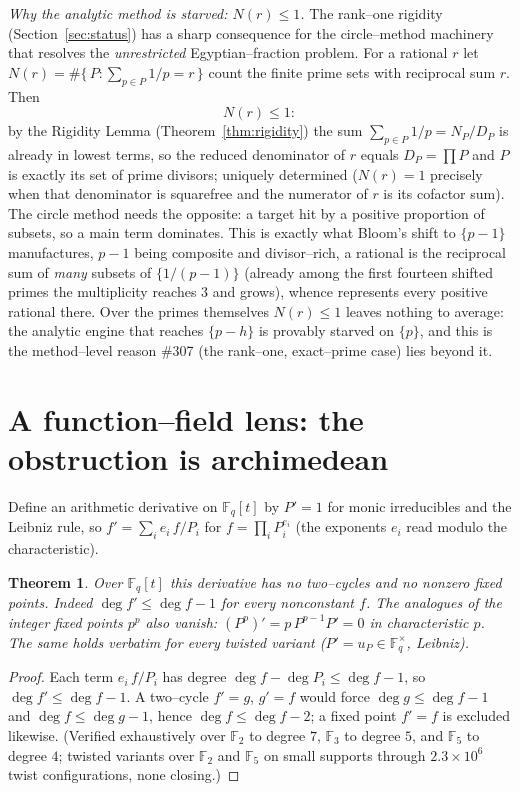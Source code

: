 \documentclass[11pt]{article}
\newtheorem{theorem}{Theorem}[section]
\theoremstyle{definition}
\begin{document}
\emph{Why the analytic method is starved: $N(r)\le1$.} The rank--one rigidity (Section~\ref{sec:status}) has a sharp consequence for the circle--method
machinery that resolves the \emph{unrestricted} Egyptian--fraction problem. For a rational $r$ let
$N(r)=\#\{\,P:\sum_{p\in P}1/p=r\,\}$ count the finite prime sets with reciprocal sum $r$. Then
\[N(r)\le1:\]
by the Rigidity Lemma (Theorem~\ref{thm:rigidity}) the sum $\sum_{p\in P}1/p=N_P/D_P$ is already in
lowest terms, so the reduced denominator of $r$ equals $D_P=\prod P$ and $P$ is exactly its set of
prime divisors; uniquely determined ($N(r)=1$ precisely when that denominator is squarefree and the
numerator of $r$ is its cofactor sum). The circle method needs the opposite: a target hit by a positive
proportion of subsets, so a main term dominates. This is exactly what Bloom's shift to $\{p-1\}$
manufactures, $p-1$ being composite and divisor--rich, a rational is the reciprocal sum of
\emph{many} subsets of $\{1/(p-1)\}$ (already among the first fourteen shifted primes the multiplicity
reaches $3$ and grows), whence \cite{BloomShifted} represents every positive rational there. Over the
primes themselves $N(r)\le1$ leaves nothing to average: the analytic engine that reaches $\{p-h\}$ is
provably starved on $\{p\}$, and this is the method--level reason \#307 (the rank--one, exact--prime
case) lies beyond it.


\section{A function--field lens: the obstruction is archimedean}\label{sec:ff}

Define an arithmetic derivative on $\mathbb{F}_q[t]$ by $P'=1$ for monic irreducibles and the Leibniz
rule, so $f'=\sum_i e_i\,f/P_i$ for $f=\prod_i P_i^{e_i}$ (the exponents $e_i$ read modulo the
characteristic).

\begin{theorem}\label{thm:ff}
Over $\mathbb{F}_q[t]$ this derivative has no two--cycles and no nonzero fixed points. Indeed
$\deg f'\le\deg f-1$ for every nonconstant $f$. The analogues of the integer fixed points $p^{p}$ also
vanish: $(P^{p})'=p\,P^{p-1}P'=0$ in characteristic $p$. The same holds verbatim for every twisted
variant ($P'=u_P\in\mathbb{F}_q^\times$, Leibniz).
\end{theorem}
\begin{proof}
Each term $e_i\,f/P_i$ has degree $\deg f-\deg P_i\le\deg f-1$, so $\deg f'\le\deg f-1$. A two--cycle
$f'=g$, $g'=f$ would force $\deg g\le\deg f-1$ and $\deg f\le\deg g-1$, hence $\deg f\le\deg f-2$;
a fixed point $f'=f$ is excluded likewise. (Verified exhaustively over $\mathbb{F}_2$ to degree $7$,
$\mathbb{F}_3$ to degree $5$, and $\mathbb{F}_5$ to degree $4$; twisted variants over $\mathbb{F}_2$ and
$\mathbb{F}_5$ on small supports through $2.3\times10^{6}$ twist configurations, none closing.)
\end{proof}
\end{document}
